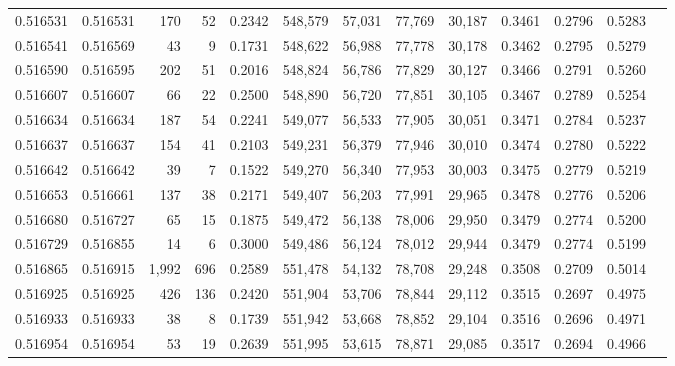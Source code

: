 \begin{tabular}{rrrrrrrrrrrrr}
0.516531 & 0.516531 &   170 &    52 &                                     0.2342 & 548,579 &  57,031 &  77,769 &  30,187 & 0.3461 & 0.2796 & 0.5283 \\
0.516541 & 0.516569 &    43 &     9 &                                     0.1731 & 548,622 &  56,988 &  77,778 &  30,178 & 0.3462 & 0.2795 & 0.5279 \\
0.516590 & 0.516595 &   202 &    51 &                                     0.2016 & 548,824 &  56,786 &  77,829 &  30,127 & 0.3466 & 0.2791 & 0.5260 \\
0.516607 & 0.516607 &    66 &    22 &                                     0.2500 & 548,890 &  56,720 &  77,851 &  30,105 & 0.3467 & 0.2789 & 0.5254 \\
0.516634 & 0.516634 &   187 &    54 &                                     0.2241 & 549,077 &  56,533 &  77,905 &  30,051 & 0.3471 & 0.2784 & 0.5237 \\
0.516637 & 0.516637 &   154 &    41 &                                     0.2103 & 549,231 &  56,379 &  77,946 &  30,010 & 0.3474 & 0.2780 & 0.5222 \\
0.516642 & 0.516642 &    39 &     7 &                                     0.1522 & 549,270 &  56,340 &  77,953 &  30,003 & 0.3475 & 0.2779 & 0.5219 \\
0.516653 & 0.516661 &   137 &    38 &                                     0.2171 & 549,407 &  56,203 &  77,991 &  29,965 & 0.3478 & 0.2776 & 0.5206 \\
0.516680 & 0.516727 &    65 &    15 &                                     0.1875 & 549,472 &  56,138 &  78,006 &  29,950 & 0.3479 & 0.2774 & 0.5200 \\
0.516729 & 0.516855 &    14 &     6 &                                     0.3000 & 549,486 &  56,124 &  78,012 &  29,944 & 0.3479 & 0.2774 & 0.5199 \\
0.516865 & 0.516915 & 1,992 &   696 &                                     0.2589 & 551,478 &  54,132 &  78,708 &  29,248 & 0.3508 & 0.2709 & 0.5014 \\
0.516925 & 0.516925 &   426 &   136 &                                     0.2420 & 551,904 &  53,706 &  78,844 &  29,112 & 0.3515 & 0.2697 & 0.4975 \\
0.516933 & 0.516933 &    38 &     8 &                                     0.1739 & 551,942 &  53,668 &  78,852 &  29,104 & 0.3516 & 0.2696 & 0.4971 \\
0.516954 & 0.516954 &    53 &    19 &                                     0.2639 & 551,995 &  53,615 &  78,871 &  29,085 & 0.3517 & 0.2694 & 0.4966 \\

\end{tabular}
